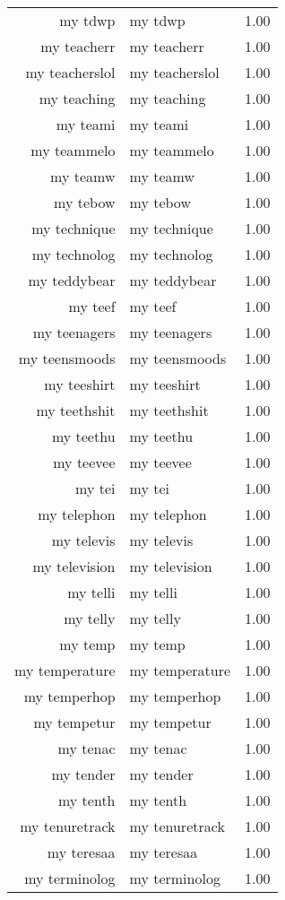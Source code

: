 \begin{table}[ht]
\begin{tabular}{rlr}
  my tdwp & my tdwp & 1.00 \\ 
  my teacherr & my teacherr & 1.00 \\ 
  my teacherslol & my teacherslol & 1.00 \\ 
  my teaching & my teaching & 1.00 \\ 
  my teami & my teami & 1.00 \\ 
  my teammelo & my teammelo & 1.00 \\ 
  my teamw & my teamw & 1.00 \\ 
  my tebow & my tebow & 1.00 \\ 
  my technique & my technique & 1.00 \\ 
  my technolog & my technolog & 1.00 \\ 
  my teddybear & my teddybear & 1.00 \\ 
  my teef & my teef & 1.00 \\ 
  my teenagers & my teenagers & 1.00 \\ 
  my teensmoods & my teensmoods & 1.00 \\ 
  my teeshirt & my teeshirt & 1.00 \\ 
  my teethshit & my teethshit & 1.00 \\ 
  my teethu & my teethu & 1.00 \\ 
  my teevee & my teevee & 1.00 \\ 
  my tei & my tei & 1.00 \\ 
  my telephon & my telephon & 1.00 \\ 
  my televis & my televis & 1.00 \\ 
  my television & my television & 1.00 \\ 
  my telli & my telli & 1.00 \\ 
  my telly & my telly & 1.00 \\ 
  my temp & my temp & 1.00 \\ 
  my temperature & my temperature & 1.00 \\ 
  my temperhop & my temperhop & 1.00 \\ 
  my tempetur & my tempetur & 1.00 \\ 
  my tenac & my tenac & 1.00 \\ 
  my tender & my tender & 1.00 \\ 
  my tenth & my tenth & 1.00 \\ 
  my tenuretrack & my tenuretrack & 1.00 \\ 
  my teresaa & my teresaa & 1.00 \\ 
  my terminolog & my terminolog & 1.00 \\ 

\end{tabular}
\end{table}
